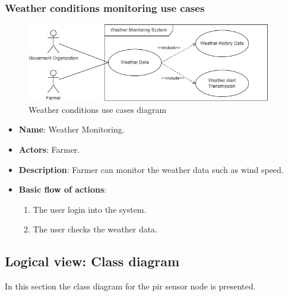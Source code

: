 \subsubsection*{Weather conditions monitoring use cases}
\begin{figure}[H]
    \centering
    \includegraphics[width=0.95\textwidth]{./images/6/weather_uses.png}
    \caption{Weather conditions use cases diagram}
\end{figure}
\begin{itemize}
    \item \textbf{Name}: Weather Monitoring.
    \item \textbf{Actors}: Farmer.
    \item \textbf{Description}: Farmer can monitor the weather data such as wind speed.
    \item \textbf{Basic flow of actions}:
        \begin{enumerate}
            \item The user login into the system.
            \item The user checks the weather data.
        \end{enumerate}
\end{itemize}

\clearpage
\subsection{Logical view: Class diagram}

In this section the class diagram for the \acrshort{pir} sensor node is presented.

